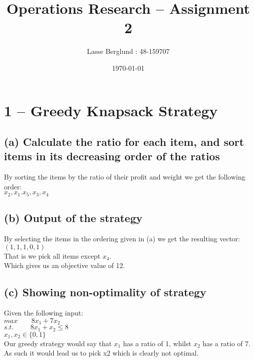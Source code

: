 \documentclass[12pt]{report}
\title{Operations Research -- Assignment 2 }
\author{Lasse Berglund : 48-159707}
\date{\today}
\begin{document}
\maketitle
\section*{1 -- Greedy Knapsack Strategy}
\subsection*{(a) Calculate the ratio for each item, and sort items in its decreasing order of the ratios}
By sorting the items by the ratio of their profit and weight we get the following order: \\

$x_2,x_1.x_5,x_3,x_4$

\subsection*{(b) Output of the strategy}
By selecting the items in the ordering given in (a) we get the resulting vector: \\
$(1,1,1,0,1)$ \\
That is we pick all items except $x_4$. \\
Which gives us an objective value of 12.

\subsection*{(c) Showing non-optimality of strategy}
Given the following input: \\
$max  \qquad 8x_1 + 7x_2$ \\
$s.t.\  \ \qquad 8x_1 + x_2 \le 8$ \\
$x_1,x_2 \in \{0,1\}$ \\

Our greedy strategy would say that $x_1$ has a ratio of 1, whilst $x_2$ has a ratio of 7. As such it would lead us to pick x2 which is clearly not optimal.


\newpage
\end{document}
